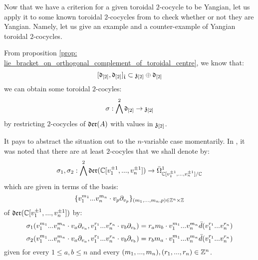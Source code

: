         Now that we have a criterion for a given toroidal $2$-cocycle to be Yangian, let us apply it to some known toroidal $2$-cocycles from \cite{billig_energy_momentum_tensor} to check whether or not they are Yangian. Namely, let us give an example and a counter-example of Yangian toroidal $2$-cocycles.
        \begin{example} \label{example: yangian_cocycles_(counter)_examples}
            From proposition \ref{prop: lie_bracket_on_orthogonal_complement_of_toroidal_centre}, we know that:
                $$[\mathfrak{d}_{[2]}, \mathfrak{d}_{[2]}]_{\hat{\mathfrak{t}}} \subset \mathfrak{z}_{[2]} \oplus \mathfrak{d}_{[2]}$$
            we can obtain some toroidal $2$-cocyles:
                $$\sigma: \bigwedge^2 \mathfrak{d}_{[2]} \to \mathfrak{z}_{[2]}$$
            by restricting $2$-cocycles of $\mathfrak{der}(A)$ with values in $\mathfrak{z}_{[2]}$.

            It pays to abstract the situation out to the $n$-variable case momentarily. In \cite[p. 5, below Equation 1.3]{billig_energy_momentum_tensor}, it was noted that there are at least $2$-cocyles that we shall denote by:
                $$\sigma_1, \sigma_2: \bigwedge^2 \mathfrak{der}(\mathbb{C}[v_1^{\pm 1}, ..., v_n^{\pm 1}]) \to \bar{\Omega}^1_{\mathbb{C}[v_1^{\pm 1}, ..., v_n^{\pm 1}]/\mathbb{C}}$$
            which are given in terms of the basis:
                $$\{ v_1^{m_1} ... v_n^{m_n} \cdot v_p \del_{v_p} \}_{(m_1, ..., m_n, p) \in \Z^n \x \Z}$$
            of $\mathfrak{der}(\mathbb{C}[v_1^{\pm 1}, ..., v_n^{\pm 1}])$ by:
                $$\sigma_1(v_1^{m_1} ... v_n^{m_n} \cdot v_a \partial_{v_a}, v_1^{r_1} ... v_n^{r_n} \cdot v_b \partial_{v_b}) = r_a m_b \cdot v_1^{m_1} ... v_n^{m_n} \bar{d}( v_1^{r_1} ... v_n^{r_n} )$$
                $$\sigma_2(v_1^{m_1} ... v_n^{m_n} \cdot v_a \partial_{v_a}, v_1^{r_1} ... v_n^{r_n} \cdot v_b \partial_{v_b}) = r_b m_a \cdot v_1^{m_1} ... v_n^{m_n} \bar{d}( v_1^{r_1} ... v_n^{r_n} )$$
            given for every $1 \leq a, b \leq n$ and every $(m_1, ..., m_n), (r_1, ..., r_n) \in \mathbb{Z}^n$. 


\end{example}
